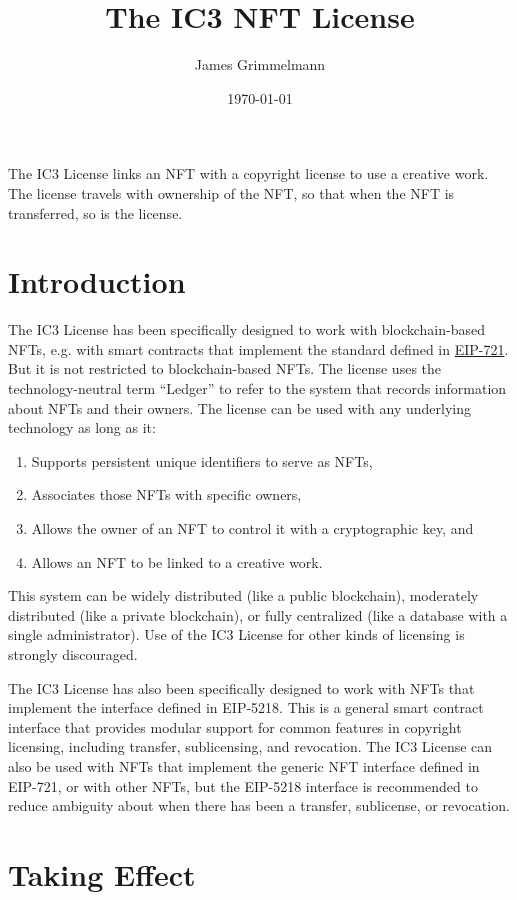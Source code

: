 \documentclass{article}
\title{The IC3 NFT License}
\author{James Grimmelmann}
\date{\today}
\newcommand{\eiplicense}{EIP-5218\xspace}
\begin{document}
\maketitle

The IC3 License links an NFT with a copyright license to use a creative work. The license travels with ownership of the NFT, so that when the NFT is transferred, so is the license. 

\section{Introduction}

The IC3 License has been specifically designed to work with blockchain-based NFTs, e.g. with smart contracts that implement the standard defined in \href{https://eips.ethereum.org/EIPS/eip-721}{EIP-721}. But it is not restricted to blockchain-based NFTs. The license uses the technology-neutral term ``Ledger'' to refer to the system that records information about NFTs and their owners. The license can be used with any underlying technology as long as it:
\begin{enumerate}
\item Supports persistent unique identifiers to serve as NFTs, 
\item Associates those NFTs with specific owners,
\item Allows the owner of an NFT to control it with a cryptographic key, and 
\item Allows an NFT to be linked to a creative work. 
\end{enumerate}
This system can be widely distributed (like a public blockchain), moderately distributed (like a private blockchain), or fully centralized (like a database with a single administrator). Use of the IC3 License for other kinds of licensing is strongly discouraged.

The IC3 License has also been specifically designed to work with NFTs that implement the interface defined in \eiplicense. This is a general smart contract interface that provides modular support for common features in copyright licensing, including transfer, sublicensing, and revocation. The IC3 License can also be used with NFTs that implement the generic NFT interface defined in EIP-721, or with other NFTs, but the \eiplicense interface is recommended to reduce ambiguity about when there has been a transfer, sublicense, or revocation.


\section{Taking Effect}
\end{document}
